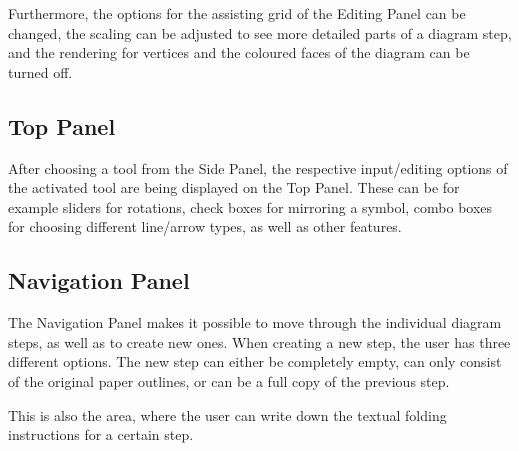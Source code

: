 Furthermore, the options for the assisting grid of the Editing Panel can be changed, the scaling can be adjusted to see more detailed parts of a diagram step, and the rendering for vertices and the coloured faces of the diagram can be turned off.

\subsection{Top Panel}
\label{sec:topPanel}

After choosing a tool from the Side Panel, the respective input/editing options of the activated tool are being displayed on the Top Panel. These can be for example sliders for rotations, check boxes for mirroring a symbol, combo boxes for choosing different line/arrow types, as well as other features.


\subsection{Navigation Panel}
\label{sec:navigationPanel}

The Navigation Panel makes it possible to move through the individual diagram steps, as well as to create new ones. When creating a new step, the user has three different options. The new step can either be completely empty, can only consist of the original paper outlines, or can be a full copy of the previous step.

This is also the area, where the user can write down the textual folding instructions for a certain step.
